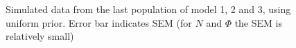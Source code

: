 \begin{figure}[H]

    \begin{center}
    \end{center}

    \caption{Simulated data from the last population of model 1, 2 and 3, using uniform prior.  Error bar indicates SEM (for $N$ and $\Phi$ the SEM is relatively small)}
    \label{fig:resultCurve_uni}


\end{figure}

